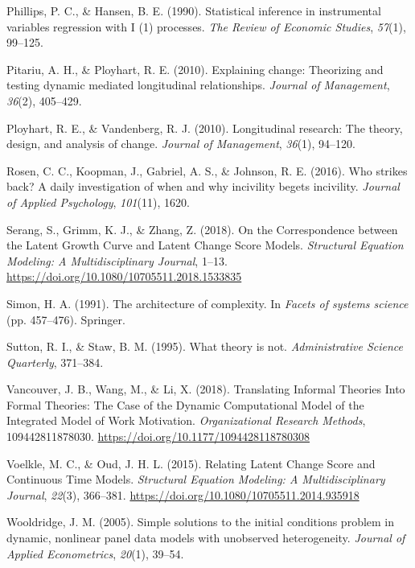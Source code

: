 \documentclass[english,,man]{apa6}
\begin{document}
\leavevmode\hypertarget{ref-phillips_statistical_1990}{}%
Phillips, P. C., \& Hansen, B. E. (1990). Statistical inference in instrumental variables regression with I (1) processes. \emph{The Review of Economic Studies}, \emph{57}(1), 99--125.

\leavevmode\hypertarget{ref-pitariu_explaining_2010}{}%
Pitariu, A. H., \& Ployhart, R. E. (2010). Explaining change: Theorizing and testing dynamic mediated longitudinal relationships. \emph{Journal of Management}, \emph{36}(2), 405--429.

\leavevmode\hypertarget{ref-ployhart_longitudinal_2010}{}%
Ployhart, R. E., \& Vandenberg, R. J. (2010). Longitudinal research: The theory, design, and analysis of change. \emph{Journal of Management}, \emph{36}(1), 94--120.

\leavevmode\hypertarget{ref-rosen_who_2016}{}%
Rosen, C. C., Koopman, J., Gabriel, A. S., \& Johnson, R. E. (2016). Who strikes back? A daily investigation of when and why incivility begets incivility. \emph{Journal of Applied Psychology}, \emph{101}(11), 1620.

\leavevmode\hypertarget{ref-serang_correspondence_2018}{}%
Serang, S., Grimm, K. J., \& Zhang, Z. (2018). On the Correspondence between the Latent Growth Curve and Latent Change Score Models. \emph{Structural Equation Modeling: A Multidisciplinary Journal}, 1--13. \url{https://doi.org/10.1080/10705511.2018.1533835}

\leavevmode\hypertarget{ref-simon1991architecture}{}%
Simon, H. A. (1991). The architecture of complexity. In \emph{Facets of systems science} (pp. 457--476). Springer.

\leavevmode\hypertarget{ref-sutton1995theory}{}%
Sutton, R. I., \& Staw, B. M. (1995). What theory is not. \emph{Administrative Science Quarterly}, 371--384.

\leavevmode\hypertarget{ref-vancouver_translating_2018}{}%
Vancouver, J. B., Wang, M., \& Li, X. (2018). Translating Informal Theories Into Formal Theories: The Case of the Dynamic Computational Model of the Integrated Model of Work Motivation. \emph{Organizational Research Methods}, 109442811878030. \url{https://doi.org/10.1177/1094428118780308}

\leavevmode\hypertarget{ref-voelkle_relating_2015}{}%
Voelkle, M. C., \& Oud, J. H. L. (2015). Relating Latent Change Score and Continuous Time Models. \emph{Structural Equation Modeling: A Multidisciplinary Journal}, \emph{22}(3), 366--381. \url{https://doi.org/10.1080/10705511.2014.935918}

\leavevmode\hypertarget{ref-wooldridge2005simple}{}%
Wooldridge, J. M. (2005). Simple solutions to the initial conditions problem in dynamic, nonlinear panel data models with unobserved heterogeneity. \emph{Journal of Applied Econometrics}, \emph{20}(1), 39--54.
\end{document}
